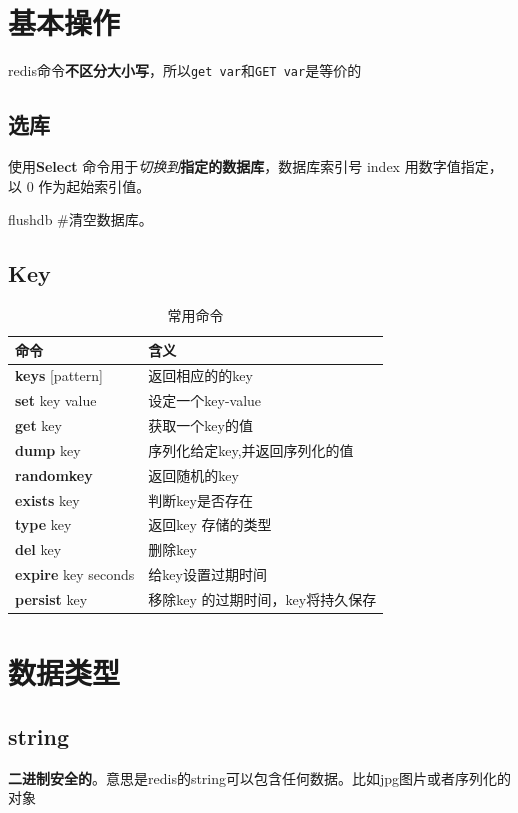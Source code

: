 \documentclass[UTF8,a4paper,12pt]{ctexbook}
\begin{document}
\chapter{基本操作}	
	redis命令\textbf{不区分大小写}，所以\verb|get var|和\verb|GET var|是等价的
	
	\section{选库}
		使用\textbf{Select} 命令用于\textit{切换到}\textbf{指定的数据库}，数据库索引号 index 用数字值指定，以 0 作为起始索引值。
	
		flushdb \#清空数据库。
		
	\section{Key}
		\begin{table}[H]
			\centering
			\caption{常用命令}
			\begin{tabular}{p{5cm}<{\centering} | p{10cm}<{\centering}}
				\hline
					命令  &  含义 \\
				\hline
					\textbf{keys} [pattern] & 返回相应的的key \\
					\textbf{set} key value & 设定一个key-value \\
					\textbf{get} key &  获取一个key的值\\
					\textbf{dump} key & 序列化给定key,并返回序列化的值\\
					\textbf{randomkey} & 返回随机的key \\
					\textbf{exists} key & 判断key是否存在 \\
					\textbf{type} key & 返回key 存储的类型 \\
					\textbf{del} key &  删除key \\
					\textbf{expire} key seconds & 给key设置过期时间 \\
					\textbf{persist} key & 移除key 的过期时间，key将持久保存 \\
				\hline
			\end{tabular}
		\end{table}

	
	
\chapter{数据类型}	
	\section{string}
		\textbf{二进制安全的}。意思是redis的string可以包含任何数据。比如jpg图片或者序列化的对象 
		
\end{document}

